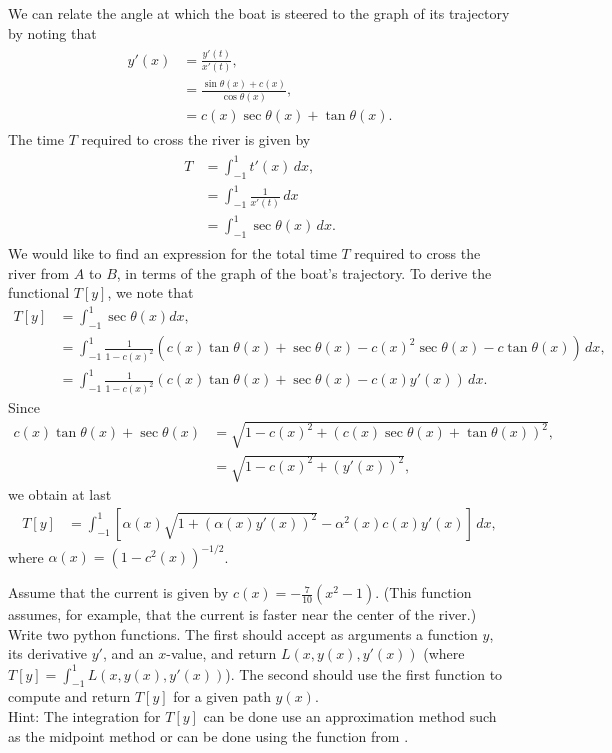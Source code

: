 We can relate the angle at which the boat is steered to the graph of its trajectory by noting that 
\begin{align}
\begin{split}
	y'(x) &= \frac{y'(t)}{x'(t)} ,\\
	&= \frac{\sin \theta(x) + c(x)}{\cos \theta(x)},\\
	&= c(x)\sec \theta(x) + \tan \theta(x) .%
\end{split} \label{rivercrossing:angle}
\end{align}
The time $T$ required to cross the river is given by
\begin{align}
\begin{split}
	T &= \int_{-1}^1 t'(x)\, dx, \\
	&= \int_{-1}^1 \frac{1}{x'(t)}\, dx \\ 
	&= \int_{-1}^1 \sec \theta(x)\, dx. 
\end{split}\label{rivercrossing:T}
\end{align}
We would like to find an expression for the total time $T$ required to cross the river from $A$ to $B$, in terms of the graph of the boat's trajectory. 
To derive the functional $T[y]$, we note that 
\begin{align*}
	T[y] &= \int_{-1}^1 \sec \theta(x) dx,\\
	&= \int_{-1}^1 \frac{1}{1-c(x)^2}(c(x) \tan \theta(x) + \sec \theta(x) -c(x)^2 \sec \theta(x) - c\tan \theta(x))\, dx, \\
	&= \int_{-1}^1 \frac{1}{1-c(x)^2}(c(x) \tan \theta(x) + \sec \theta(x) -c(x) y'(x) )\, dx.	
\end{align*}
Since 
\begin{align*}
	c(x)\tan \theta(x) + \sec \theta(x) &= \sqrt{1 - c(x)^2 + (c(x) \sec \theta(x) + \tan \theta(x))^2},\\
	&= \sqrt{1 - c(x)^2 + (y'(x))^2},
\end{align*}
we obtain at last
\begin{align}
	T[y] &= \int_{-1}^1 \left[ \alpha(x)\sqrt{1 + (\alpha(x) y'(x))^2} - \alpha^2(x) c(x) y'(x) \right]\, dx,
\end{align}
where $\alpha(x) = (1 - c^2(x))^{-1/2}$.

\begin{problem}
Assume that the current is given by $c(x) = -\frac{7}{10}(x^2-1)$. (This function assumes, for example, that the current is faster near the center of the river.)
Write two python functions. The first should accept as arguments a function $y$, its derivative $y'$, and an $x$-value, and return $L(x,y(x),y'(x))$ (where $T[y] = \int_{-1}^1 L(x,y(x),y'(x))$). 
The second should use the first function to compute and return $T[y]$ for a given path $y(x)$.
\\ Hint: The integration for $T[y]$ can be done use an approximation method such as the midpoint method or can be done using the  function from .
\end{problem}

